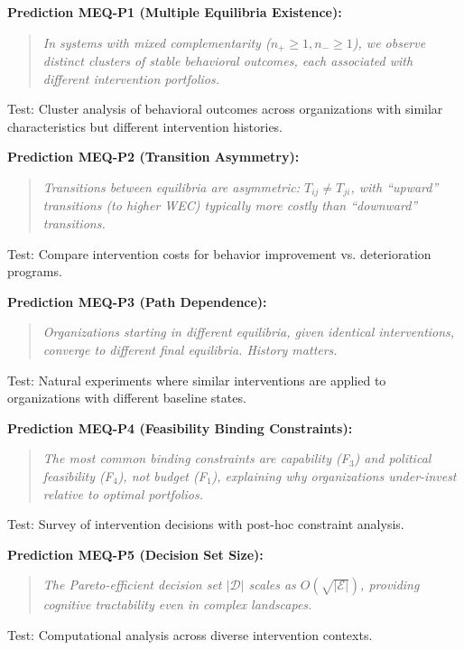 \begin{tcolorbox}[colback=yellow!5!white, colframe=yellow!75!black,
    title=Falsifiable Predictions from MEQ]

\textbf{Prediction MEQ-P1 (Multiple Equilibria Existence):}
\begin{quote}
\textit{In systems with mixed complementarity ($n_+ \geq 1, n_- \geq 1$), we observe
distinct clusters of stable behavioral outcomes, each associated with different
intervention portfolios.}
\end{quote}
Test: Cluster analysis of behavioral outcomes across organizations with similar
characteristics but different intervention histories.

\textbf{Prediction MEQ-P2 (Transition Asymmetry):}
\begin{quote}
\textit{Transitions between equilibria are asymmetric: $T_{ij} \neq T_{ji}$, with
``upward'' transitions (to higher WEC) typically more costly than ``downward''
transitions.}
\end{quote}
Test: Compare intervention costs for behavior improvement vs. deterioration programs.

\textbf{Prediction MEQ-P3 (Path Dependence):}
\begin{quote}
\textit{Organizations starting in different equilibria, given identical interventions,
converge to different final equilibria. History matters.}
\end{quote}
Test: Natural experiments where similar interventions are applied to organizations
with different baseline states.

\textbf{Prediction MEQ-P4 (Feasibility Binding Constraints):}
\begin{quote}
\textit{The most common binding constraints are capability (F$_3$) and political
feasibility (F$_4$), not budget (F$_1$), explaining why organizations under-invest
relative to optimal portfolios.}
\end{quote}
Test: Survey of intervention decisions with post-hoc constraint analysis.

\textbf{Prediction MEQ-P5 (Decision Set Size):}
\begin{quote}
\textit{The Pareto-efficient decision set $|\mathcal{D}|$ scales as $O(\sqrt{|\mathcal{E}|})$,
providing cognitive tractability even in complex landscapes.}
\end{quote}
Test: Computational analysis across diverse intervention contexts.

\end{tcolorbox}

